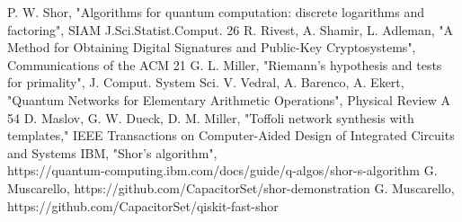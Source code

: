 \documentclass[conference]{IEEEtran}
\begin{document}
\begin{thebibliography}{00}
 P. W. Shor, "Algorithms for quantum computation: discrete logarithms and factoring", SIAM J.Sci.Statist.Comput. 26
 R. Rivest, A. Shamir, L. Adleman, "A Method for Obtaining Digital Signatures and Public-Key Cryptosystems", Communications of the ACM 21
 G. L. Miller, "Riemann's hypothesis and tests for primality", J. Comput. System Sci.
 V. Vedral, A. Barenco, A. Ekert, "Quantum Networks for Elementary Arithmetic Operations", Physical Review A 54
 D. Maslov, G. W. Dueck, D. M. Miller, "Toffoli network synthesis with templates," IEEE Transactions on Computer-Aided Design of Integrated Circuits and Systems
 IBM, "Shor's algorithm",\\https://quantum-computing.ibm.com/docs/guide/q-algos/shor-s-algorithm
 G. Muscarello, https://github.com/CapacitorSet/shor-demonstration
 G. Muscarello, https://github.com/CapacitorSet/qiskit-fast-shor
\end{thebibliography}
\vspace{12pt}
\end{document}
